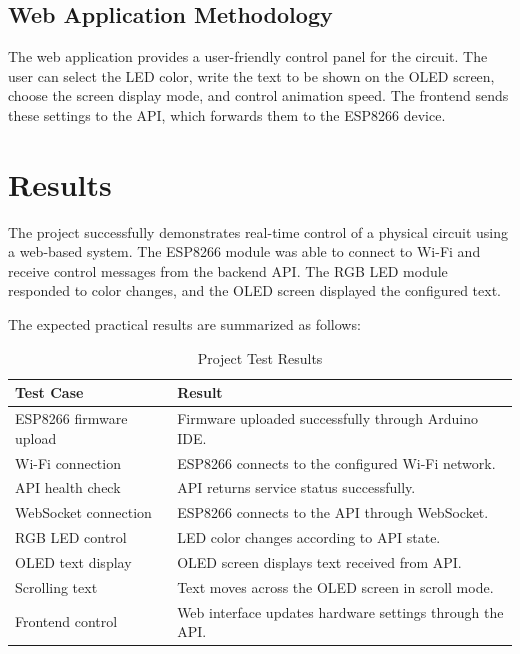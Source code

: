 \documentclass[12pt,a4paper]{report}
\begin{document}
\section{Web Application Methodology}

The web application provides a user-friendly control panel for the circuit. The user can select the LED color, write the text to be shown on the OLED screen, choose the screen display mode, and control animation speed. The frontend sends these settings to the API, which forwards them to the ESP8266 device.

\chapter{Results}

The project successfully demonstrates real-time control of a physical circuit using a web-based system. The ESP8266 module was able to connect to Wi-Fi and receive control messages from the backend API. The RGB LED module responded to color changes, and the OLED screen displayed the configured text.

The expected practical results are summarized as follows:

\begin{table}[H]
\centering
\renewcommand{\arraystretch}{1.4}
\begin{tabular}{p{5cm} p{8cm}}
\toprule
\textbf{Test Case} & \textbf{Result} \\
\midrule
ESP8266 firmware upload & Firmware uploaded successfully through Arduino IDE. \\
Wi-Fi connection & ESP8266 connects to the configured Wi-Fi network. \\
API health check & API returns service status successfully. \\
WebSocket connection & ESP8266 connects to the API through WebSocket. \\
RGB LED control & LED color changes according to API state. \\
OLED text display & OLED screen displays text received from API. \\
Scrolling text & Text moves across the OLED screen in scroll mode. \\
Frontend control & Web interface updates hardware settings through the API. \\
\bottomrule
\end{tabular}
\caption{Project Test Results}
\end{table}
\end{document}
